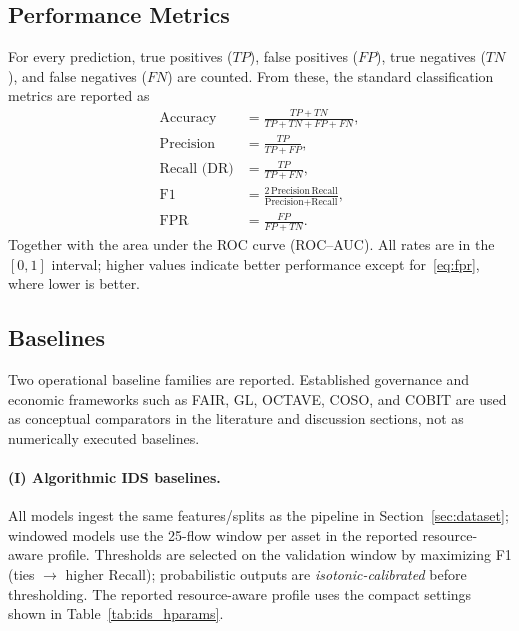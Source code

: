 \documentclass[preprint,12pt]{elsarticle}
\def\textsubscript#1{#1}%
\begin{document}
\subsection{Performance Metrics}
\label{sec:metrics}

For every prediction, true positives ($TP$), false positives ($FP$), true negatives ($TN$), and false negatives ($FN$) are counted.  
From these, the standard classification metrics are reported as
\begin{align}
  \text{Accuracy}      &= \frac{TP + TN}{TP + TN + FP + FN}, \label{eq:acc} \\
  \text{Precision}     &= \frac{TP}{TP + FP},               \label{eq:prec}\\
  \text{Recall (DR)}   &= \frac{TP}{TP + FN},                \label{eq:rec}\\
  \text{F\textsubscript{1}} &= \frac{2\,\text{Precision}\,\text{Recall}}
                                   {\text{Precision}+\text{Recall}}, \label{eq:f1}\\
  \text{FPR}           &= \frac{FP}{FP + TN}.               \label{eq:fpr}
\end{align}
Together with the area under the ROC curve (ROC--AUC).
All rates are in the $[0,1]$ interval; higher values indicate better
performance except for~\eqref{eq:fpr}, where lower is better.

\subsection{Baselines}
\label{sec:baselines}

Two operational baseline families are reported. Established governance and economic frameworks such as FAIR, GL, OCTAVE, COSO, and COBIT are used as conceptual comparators in the literature and discussion sections, not as numerically executed baselines.

\paragraph{(I) Algorithmic IDS baselines.}
All models ingest the same features/splits as the pipeline in Section~\ref{sec:dataset}; windowed models use the 25-flow window per asset in the reported resource-aware profile. Thresholds are selected on the validation window by maximizing F\textsubscript{1} (ties $\to$ higher Recall); probabilistic outputs are \emph{isotonic-calibrated} before thresholding. The reported resource-aware profile uses the compact settings shown in Table~\ref{tab:ids_hparams}.
\end{document}
